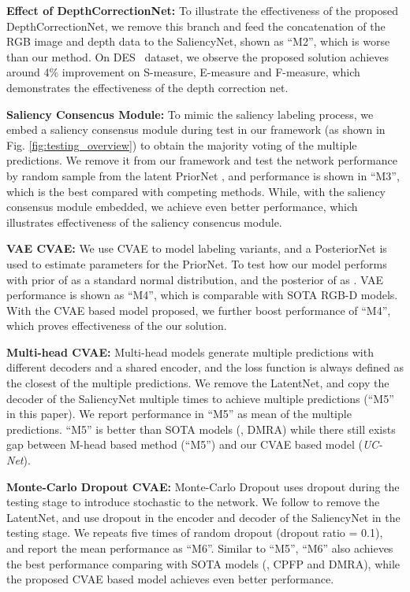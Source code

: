 \documentclass[10pt,twocolumn,letterpaper]{article}
\def\ourmodel{\textit{UC-Net}}
\begin{document}
\noindent\textbf{Effect of DepthCorrectionNet:}
To illustrate the effectiveness of the proposed DepthCorrectionNet, we remove this branch and feed the concatenation of the RGB image and depth data to the SaliencyNet, shown as \enquote{M2}, which is worse than our method. On DES~\cite{cheng2014depth} dataset, we observe the proposed solution achieves around 4\% improvement on S-measure, E-measure and F-measure, which demonstrates the effectiveness of the depth correction net.


\noindent\textbf{Saliency Consencus Module:}
To mimic the saliency labeling process, we embed a saliency consensus module during test in our framework (as shown in Fig. \ref{fig:testing_overview}) to obtain the majority voting of the multiple predictions. We remove it from our framework and test the network performance by random sample from the latent PriorNet , and performance is shown in \enquote{M3}, which is the best compared with competing methods. While, with the saliency consensus module embedded, we achieve even better performance, which illustrates effectiveness of the saliency consencus module.

\noindent\textbf{VAE  CVAE:}
We use CVAE to model labeling variants, and a PosteriorNet is used to estimate parameters for the PriorNet.
To test how our model performs with prior of  as a standard normal distribution,
and the posterior of  as . 
VAE performance is shown as \enquote{M4}, which is comparable with SOTA RGB-D models. With the CVAE \cite{structure_output} based model proposed, we further boost performance of \enquote{M4}, which proves effectiveness of the our solution.

\noindent\textbf{Multi-head  CVAE:}
Multi-head models \cite{Rupprecht2016LearningIA} generate multiple predictions with different decoders and a shared encoder, and the loss function is always defined as the closest of the multiple predictions. We remove the LatentNet, and copy the decoder of the SaliencyNet multiple times to achieve multiple predictions (\enquote{M5} in this paper). We report performance in \enquote{M5} as mean of the multiple predictions. \enquote{M5} is better than SOTA models (\eg, DMRA) while there still exists gap between M-head based method (\enquote{M5}) and our CVAE based model (\ourmodel).

\noindent\textbf{Monte-Carlo Dropout  CVAE:}
Monte-Carlo Dropout \cite{kendall2015bayesian} uses dropout during the testing stage to introduce stochastic to the network. We follow \cite{kendall2015bayesian} to remove the LatentNet, and use dropout in the encoder and decoder of the SaliencyNet in the testing stage. We repeats five times of random dropout (dropout ratio = 0.1), and report the mean performance as \enquote{M6}. Similar to \enquote{M5}, \enquote{M6} also achieves the best performance comparing with SOTA models (\eg, CPFP and DMRA), while the proposed CVAE based model achieves even better performance.
\end{document}
